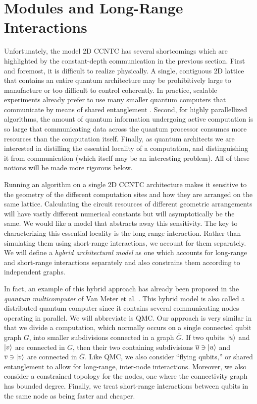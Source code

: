 \section{Modules and Long-Range Interactions}
\label{sec:intro-modules}


Unfortunately, the model \textsf{2D CCNTC} has several shortcomings
which are highlighted by the constant-depth communication in the
previous section. First and foremost, it is difficult to realize physically. 
A single, contiguous
2D lattice that contains an entire quantum architecture
may be prohibitively large to manufacture or too difficult to control
coherently. In practice,
scalable experiments already prefer to use many
smaller quantum computers that communicate by means of shared
entanglement \cite{Monroe2012}. Second, for highly parallellized
algorithms, the amount of quantum information undergoing active
computation is so large that communicating data across the
quantum processor consumes more resources than the computation
itself. Finally, as quantum architects we are interested in distilling
the essential locality of a computation, and distinguishing it from
communication (which itself may be an interesting problem). All of these
notions will be made more rigorous below.

Running an
algorithm on a single \textsf{2D CCNTC} architecture makes it
sensitive to the geometry of the different computation sites and how they
are arranged on the same lattice. Calculating the circuit resources of different
geometric arrangements will have vastly different numerical constants but will asymptotically
be the same. We would like a model that abstracts away this sensitivity.
The key to characterizing this essential locality is the long-range interaction. Rather than simulating them using short-range interactions,
we account for them separately. We will define a
\emph{hybrid architectural model} as one which accounts for long-range
and short-range interactions separately and also constrains them
according to independent graphs.

In fact, an example of this hybrid approach has already been proposed
in the \emph{quantum multicomputer} of Van Meter et al. \cite{VanMeter2008}.
This hybrid model is also called a distributed quantum computer since it contains several communicating nodes operating in parallel.
We will abbreviate is \textsf{QMC}.
Our approach is
very similar in that we divide a computation, which normally occurs on a single connected qubit graph $G$, into smaller subdivisions connected in
a graph $\overline{G}$. If two qubits $\left\vert{u}\right\rangle$ and $\left\vert{v}\right\rangle$ are connected
in $G$, then their two containing subdivisions $\overline{u} \ni \left\vert{u}\right\rangle$
and $\overline{v} \ni \left\vert{v}\right\rangle$ are connected in $\overline{G}$.
Like \textsf{QMC}, we also consider ``flying qubits,'' or shared
entanglement to allow for long-range, inter-node interactions. Moreover,
we also
consider a constrained topology for the nodes, one where the connectivity
graph has bounded degree. Finally, we treat short-range interactions between
qubits in the same node as being faster and cheaper.


